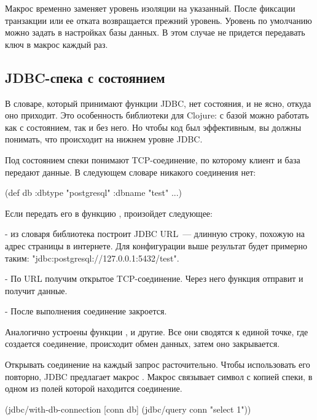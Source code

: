 Макрос временно заменяет уровень изоляции на указанный. После фиксации транзакции или ее отката возвращается прежний уровень. Уровень по умолчанию можно задать в настройках базы данных. В этом случае не придется передавать ключ  в макрос каждый раз.

\subsection{JDBC-спека с состоянием}

В словаре, который принимают функции JDBC, нет состояния, и не ясно, откуда оно приходит. Это особенность библиотеки для Clojure: с базой можно работать как с состоянием, так и без него. Но чтобы код был эффективным, вы должны понимать, что происходит на нижнем уровне JDBC.

Под состоянием спеки понимают TCP-соединение, по которому клиент и база передают данные. В следующем словаре никакого соединения нет:

\begin{english}
  \begin{clojure}
(def db {:dbtype "postgresql"
         :dbname "test"
         ...})
  \end{clojure}
\end{english}

Если передать его в функцию , произойдет следующее:

- из словаря библиотека построит JDBC URL~--- длинную строку, похожую на адрес страницы в интернете. Для конфигурации выше результат будет примерно таким: "jdbc:postgresql://127.0.0.1:5432/test".

- По URL получим открытое TCP-соединение. Через него функция  отправит и получит данные.

- После выполнения  соединение закроется.

Аналогично устроены функции ,  и другие. Все они сводятся к единой точке, где создается соединение, происходит обмен данных, затем оно закрывается.

Открывать соединение на каждый запрос расточительно. Чтобы использовать его повторно, JDBC предлагает макрос . Макрос связывает символ с копией спеки, в одном из полей которой находится соединение.

\begin{english}
  \begin{clojure}
(jdbc/with-db-connection [conn db]
  (jdbc/query conn "select 1"))
  \end{clojure}
\end{english}

